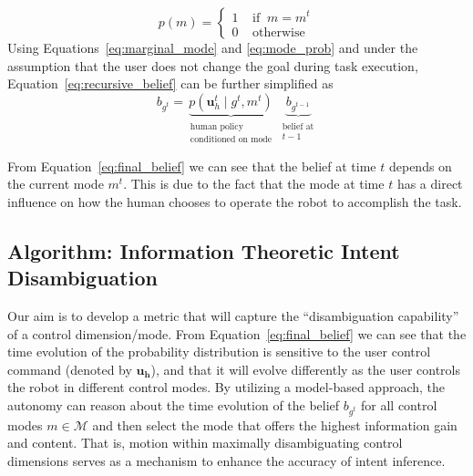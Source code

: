 \documentclass[letterpaper, 10 pt, conference]{ieeeconf}  %
\begin{document}
\begin{equation}\label{eq:mode_prob}
	p(m) = \begin{cases}
		1 \;\;\;\; \text{if} \;\; m = m^t \\
		0 \;\;\;\; \text{otherwise}
	\end{cases}
\end{equation}
Using Equations~\ref{eq:marginal_mode} and \ref{eq:mode_prob} and under the assumption that the user does not change the goal during task execution, Equation~\ref{eq:recursive_belief} can be further simplified as 
\begin{equation}\label{eq:final_belief}
	b_{g^t} = \underbrace{p(\boldsymbol{u}_h^t \;|\; g^t, m^t )}_{\substack{\text{human policy} \\ \text{conditioned on mode}}}\;\underbrace{b_{g^{t-1}}}_{\substack{\text{belief at}\\ \text{$t-1$}}}
\end{equation}

From Equation~\ref{eq:final_belief} we can see that the belief at time $t$ depends on the current mode $m^t$. This is due to the fact that the mode at time $t$ has a direct influence on how the human chooses to operate the robot to accomplish the task. 

\subsection{Algorithm: Information Theoretic Intent Disambiguation}

Our aim is to develop a metric that will capture the ``disambiguation capability'' of a control dimension/mode. 
From Equation~\ref{eq:final_belief} we can see that the time evolution of the probability distribution is sensitive to the user control command (denoted by $\boldsymbol{u_h}$), and that it will evolve differently as the user controls the robot in different control modes. By utilizing a model-based approach, the autonomy can reason about the time evolution of the belief $b_{g^t}$ for all control modes $m \in \mathcal{M}$ and then select the mode that offers the highest information gain and content. That is, motion within maximally disambiguating control dimensions serves as a mechanism to enhance the accuracy of intent inference. 
\end{document}
